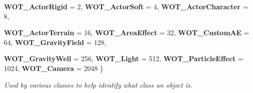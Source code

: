 \begin{DoxyCompactItemize}
{\bfseries WOT\_\-ActorRigid} =  2, 
{\bfseries WOT\_\-ActorSoft} =  4, 
{\bfseries WOT\_\-ActorCharacter} =  8, 
\par
{\bfseries WOT\_\-ActorTerrain} =  16, 
{\bfseries WOT\_\-AreaEffect} =  32, 
{\bfseries WOT\_\-CustomAE} =  64, 
{\bfseries WOT\_\-GravityField} =  128, 
\par
{\bfseries WOT\_\-GravityWell} =  256, 
{\bfseries WOT\_\-Light} =  512, 
{\bfseries WOT\_\-ParticleEffect} =  1024, 
{\bfseries WOT\_\-Camera} =  2048
 \}
\begin{DoxyCompactList}\small\item\em Used by various classes to help identify what class an object is. \item\end{DoxyCompactList}\end{DoxyCompactItemize}
